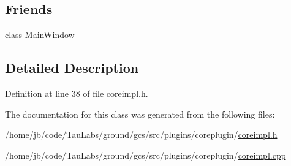 \subsection*{\-Friends}
\begin{DoxyCompactItemize}
\item 
class \hyperlink{group___core_plugin_gaf9db4b672c4d3104f5541893e08e1809}{\-Main\-Window}
\end{DoxyCompactItemize}


\subsection{\-Detailed \-Description}


\-Definition at line 38 of file coreimpl.\-h.



\-The documentation for this class was generated from the following files\-:\begin{DoxyCompactItemize}
\item 
/home/jb/code/\-Tau\-Labs/ground/gcs/src/plugins/coreplugin/\hyperlink{coreimpl_8h}{coreimpl.\-h}\item 
/home/jb/code/\-Tau\-Labs/ground/gcs/src/plugins/coreplugin/\hyperlink{coreimpl_8cpp}{coreimpl.\-cpp}\end{DoxyCompactItemize}
